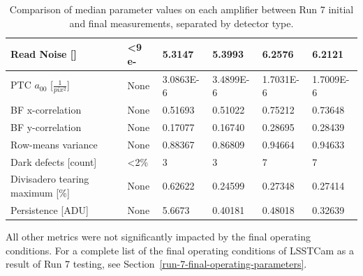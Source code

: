 \begin{table}[ht]
{\begin{tabular}{|l|l|ll|ll|}
Read Noise {[}{]}           &                      <9 e-        & \multicolumn{1}{l|}{5.3147}              &      5.3993      & \multicolumn{1}{l|}{6.2576}              &      6.2121     \\ \hline
PTC $a_{00}$ [$\frac{1}{pix^2}$]  &      None                          & \multicolumn{1}{l|}{3.0863E-6}              &       3.4899E-6      & \multicolumn{1}{l|}{1.7031E-6}              &        1.7009E-6     \\ \hline
BF x-correlation                  &      None                          & \multicolumn{1}{l|}{0.51693}              &     0.51022        & \multicolumn{1}{l|}{0.75212}              &       0.73648      \\ \hline
BF y-correlation                  &        None                        & \multicolumn{1}{l|}{0.17077}              &       0.16740      & \multicolumn{1}{l|}{0.28695}              &        0.28439     \\ \hline
Row-means variance                &       None                         & \multicolumn{1}{l|}{0.88367}              &      0.86809       & \multicolumn{1}{l|}{0.94664}              &        0.94633     \\ \hline
Dark defects {[}count{]}          &       <2\%                          & \multicolumn{1}{l|}{3}              &       3      & \multicolumn{1}{l|}{7}              &       7      \\ \hline
Divisadero tearing maximum {[}\%{]} &     None                     & \multicolumn{1}{l|}{0.62622}              &       0.24599      & \multicolumn{1}{l|}{0.27348}              &       0.27414      \\ \hline
Persistence {[}ADU{]}             &       None                         & \multicolumn{1}{l|}{5.6673}              &       0.40181      & \multicolumn{1}{l|}{0.48018}              &       0.32639      \\ \hline
\end{tabular}
}
\caption{Comparison of median parameter values on each amplifier between Run 7 initial and final measurements, separated by detector type.}
\label{table:FinalChar-paramTable}
\end{table}      



All other metrics were not significantly impacted by the final operating conditions. For a complete list of the final operating conditions of LSSTCam as a result of Run 7 testing, see Section~\ref{run-7-final-operating-parameters}.


